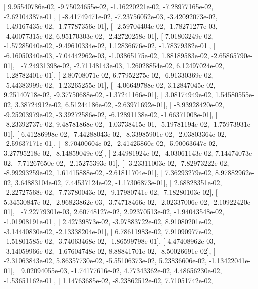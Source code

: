 \documentclass{article}
\begin{document}
       [  9.95540786e-02,  -9.75024655e-02,  -1.16220221e-02,
         -7.28977165e-02,  -2.62104387e-01],
       [ -8.41749471e-02,  -7.23756052e-03,  -3.42092073e-02,
         -1.49167435e-02,  -1.77787356e-01],
       [ -2.59704404e-02,  -1.78271277e-03,  -4.40077315e-02,
          6.95170303e-02,  -2.42720258e-01],
       [  7.01803249e-02,  -1.57285040e-02,  -9.49610334e-02,
          1.12836676e-02,  -1.78379382e-01],
       [ -6.16050340e-03,  -7.04442962e-03,  -1.03865175e-02,
          1.88189583e-02,  -2.65865790e-01],
       [ -7.24931398e-02,  -2.71148143e-03,   1.26028854e-02,
          6.12497024e-02,  -1.28782401e-01],
       [  2.80708071e-02,   6.77952275e-02,  -6.91330369e-02,
         -5.44383999e-02,  -1.23265255e-01],
       [ -4.06649788e-02,   3.12847045e-02,   9.25140718e-02,
         -9.37750688e-02,  -1.37241166e-01],
       [  3.08174949e-02,   1.54580555e-02,   3.38724912e-02,
          6.51244186e-02,  -2.63971692e-01],
       [ -8.93928420e-02,  -9.25203979e-02,  -3.39272586e-02,
         -6.12891138e-02,  -1.66371008e-01],
       [ -8.23392737e-02,   9.48781868e-02,  -1.03738415e-01,
         -5.19781194e-02,  -1.75973931e-01],
       [  6.41286998e-02,  -7.44288043e-02,  -8.33985901e-02,
         -2.03803364e-02,  -2.59637171e-01],
       [ -8.70400604e-02,  -2.41425860e-02,  -5.90063647e-02,
          3.27795218e-02,  -8.14859049e-02],
       [  2.44981924e-02,  -4.03061143e-02,   7.14474073e-02,
         -7.71267650e-02,  -2.15275393e-01],
       [ -3.23311003e-02,  -7.82973222e-02,  -8.99293259e-02,
          1.61415888e-02,  -2.61811704e-01],
       [  7.36293279e-02,   8.97882962e-02,   3.64883104e-02,
          7.44537124e-02,  -1.17306873e-01],
       [  2.68828351e-02,  -2.22727568e-02,  -7.73780043e-02,
         -9.17980741e-02,  -7.18280103e-02],
       [  5.34530847e-02,  -2.96823862e-03,  -3.74718466e-02,
         -2.02337006e-02,  -2.10922420e-01],
       [ -7.22779301e-03,   2.60748127e-02,   2.92370513e-02,
         -1.94043548e-02,  -1.01908191e-01],
       [  2.42739873e-02,  -3.97883722e-02,   8.91080201e-02,
         -3.14440830e-02,  -2.13338204e-01],
       [  6.78611983e-02,   7.91090977e-02,  -1.51801585e-02,
         -3.74063468e-02,  -1.86599798e-01],
       [  4.47408962e-03,  -3.14059966e-02,  -1.67604748e-02,
          8.88841701e-02,  -8.50026691e-02],
       [ -2.31063843e-02,   5.86357730e-02,  -5.55106373e-02,
          5.23836606e-02,  -1.13422041e-01],
       [  9.02094055e-03,  -1.74177616e-02,   4.77343362e-02,
          4.48656230e-02,  -1.53651162e-01],
       [  1.14763685e-02,  -8.23862512e-02,   7.71051742e-02,
\end{document}
